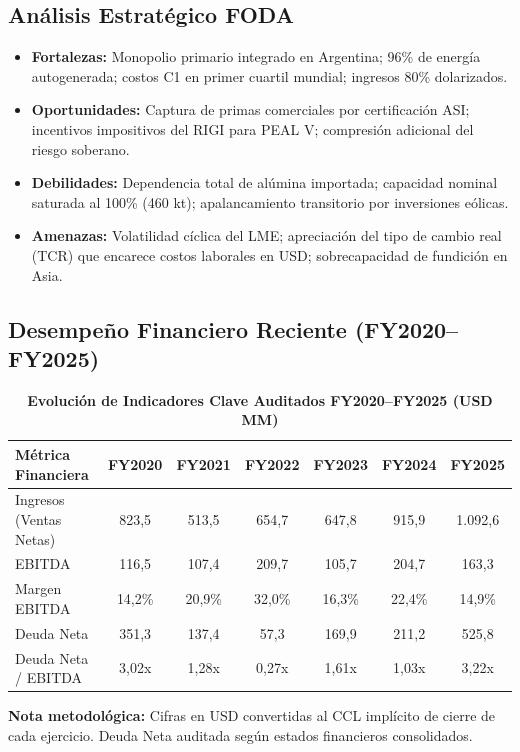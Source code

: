 \documentclass[10pt,a4paper]{article}
\begin{document}
\subsection{Análisis Estratégico FODA}
\begin{itemize}
    \item \textbf{Fortalezas:} Monopolio primario integrado en Argentina; 96\% de energía autogenerada; costos C1 en primer cuartil mundial; ingresos 80\% dolarizados.
    \item \textbf{Oportunidades:} Captura de primas comerciales por certificación ASI; incentivos impositivos del RIGI para PEAL V; compresión adicional del riesgo soberano.
    \item \textbf{Debilidades:} Dependencia total de alúmina importada; capacidad nominal saturada al 100\% (460 kt); apalancamiento transitorio por inversiones eólicas.
    \item \textbf{Amenazas:} Volatilidad cíclica del LME; apreciación del tipo de cambio real (TCR) que encarece costos laborales en USD; sobrecapacidad de fundición en Asia.
\end{itemize}

\subsection{Desempeño Financiero Reciente (FY2020--FY2025)}
\begin{table}[H]
\centering
\caption{\textbf{Evolución de Indicadores Clave Auditados FY2020–FY2025 (USD MM)}}
\small
\begin{tabular}{lcccccc}
\toprule
\textbf{Métrica Financiera} & \textbf{FY2020} & \textbf{FY2021} & \textbf{FY2022} & \textbf{FY2023} & \textbf{FY2024} & \textbf{FY2025} \\
\midrule
Ingresos (Ventas Netas) & 823,5 & 513,5 & 654,7 & 647,8 & 915,9 & 1.092,6 \\
EBITDA & 116,5 & 107,4 & 209,7 & 105,7 & 204,7 & 163,3 \\
Margen EBITDA & 14,2\% & 20,9\% & 32,0\% & 16,3\% & 22,4\% & 14,9\% \\
Deuda Neta & 351,3 & 137,4 & 57,3 & 169,9 & 211,2 & 525,8 \\
Deuda Neta / EBITDA & 3,02x & 1,28x & 0,27x & 1,61x & 1,03x & 3,22x \\
\bottomrule
\end{tabular}
\end{table}

\noindent
{\tiny \textbf{Nota metodológica:} Cifras en USD convertidas al CCL implícito de cierre de cada ejercicio. Deuda Neta auditada según estados financieros consolidados.\par}
\end{document}
